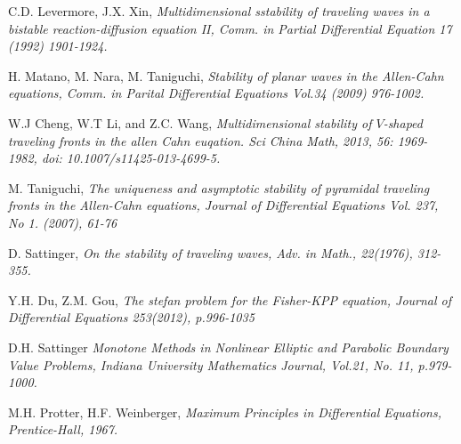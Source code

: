 \documentclass[12pt, a4paper]{article}
\numberwithin{equation}{section}
\begin{document}
\begin{CJK}{UTF8}{bkai}
\begin{thebibliography}{99}
	 C.D. Levermore, J.X. Xin, {\it Multidimensional sstability of traveling waves in a bistable reaction-diffusion equation II, Comm. in Partial Differential Equation 17 (1992) 1901-1924.}

	 H. Matano, M. Nara, M. Taniguchi, {\it Stability of planar waves in the Allen-Cahn equations, Comm. in Parital Differential Equations Vol.34 (2009) 976-1002.}

	 W.J Cheng, W.T Li, and Z.C. Wang, {\it Multidimensional stability of $V$-shaped traveling fronts in the allen Cahn euqation. Sci China Math, 2013, 56: 1969-1982, doi: 10.1007/s11425-013-4699-5.}
	
	 M. Taniguchi, {\it The uniqueness and asymptotic stability of pyramidal traveling  fronts in the Allen-Cahn equations, Journal of Differential Equations Vol. 237, No 1. (2007), 61-76}

	 D. Sattinger, {\it On the stability of traveling waves, Adv. in Math., 22(1976), 312-355.}

	 Y.H. Du, Z.M. Gou, {\it The stefan problem for the Fisher-KPP equation, Journal of Differential Equations 253(2012), p.996-1035}

	 D.H. Sattinger {\it Monotone Methods in Nonlinear Elliptic and Parabolic Boundary Value Problems, Indiana University Mathematics Journal, Vol.21, No. 11, p.979-1000.}

	 M.H. Protter, H.F. Weinberger, {\it Maximum Principles in Differential Equations, Prentice-Hall, 1967.}
\end{thebibliography}
\end{CJK}
\end{document}
